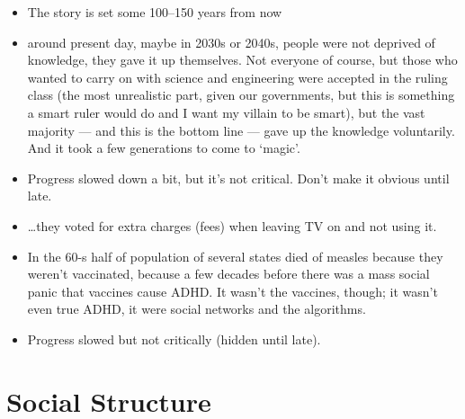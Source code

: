 \documentclass[12pt]{article}
\begin{document}
\begin{itemize}
  \item The story is set some 100--150 years from now
  \item around present day, maybe in 2030s or 2040s, people were not deprived of knowledge, they gave it up themselves. Not everyone of course, but those who wanted to carry on with science and engineering were accepted in the ruling class (the most unrealistic part, given our governments, but this is something a smart ruler would do and I want my villain to be smart), but the vast majority — and this is the bottom line — gave up the knowledge voluntarily. And it took a few generations to come to ‘magic’.
  \item Progress slowed down a bit, but it’s not critical. Don’t make it obvious until late.
  \item \ldots{}they voted for extra charges (fees) when leaving TV on and not using it.
  \item In the 60-s half of population of several states died of measles because they weren’t vaccinated, because a few decades before there was a mass social panic that vaccines cause ADHD. It wasn’t the vaccines, though; it wasn’t even true ADHD, it were social networks and the algorithms.
  \item Progress slowed but not critically (hidden until late).
\end{itemize}

\section{Social Structure}
\end{document}
